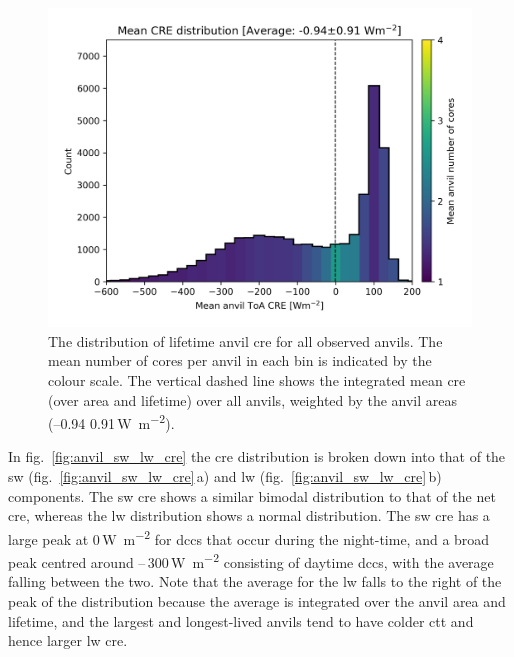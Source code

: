 \begin{figure}[tp]
    \includegraphics[width=\textwidth]{figures/chapter4_14.png}
    \caption[
    The distribution of lifetime anvil \acrshort{cre} for all observed anvils
    ]{
    The distribution of lifetime anvil \acrshort{cre} for all observed anvils. The mean number of cores per anvil in each bin is indicated by the colour scale. The vertical dashed line shows the integrated mean \acrshort{cre} (over area and lifetime) over all anvils, weighted by the anvil areas (--0.94\,\textpm\,0.91\,\unit{W m^{-2}}).
    }
    \label{fig:anvil_cre_dist}
\end{figure}


In fig.~\ref{fig:anvil_sw_lw_cre} the \acrshort{cre} distribution is broken down into that of the \acrshort{sw} (fig.~\ref{fig:anvil_sw_lw_cre}\,a) and \acrshort{lw} (fig.~\ref{fig:anvil_sw_lw_cre}\,b) components. 
The \acrshort{sw} \acrshort{cre} shows a similar bimodal distribution to that of the net \acrshort{cre}, whereas the \acrshort{lw} distribution shows a normal distribution. 
The \acrshort{sw} \acrshort{cre} has a large peak at 0\,\unit{W m^{-2}} for \acrshort{dcc}s that occur during the night-time, and a broad peak centred around --\,300\,\unit{W m^{-2}} consisting of daytime \acrshort{dcc}s, with the average falling between the two. 
Note that the average for the \acrshort{lw} falls to the right of the peak of the distribution because the average is integrated over the anvil area and lifetime, and the largest and longest-lived anvils tend to have colder \acrshort{ctt} and hence larger \acrshort{lw} \acrshort{cre}.


